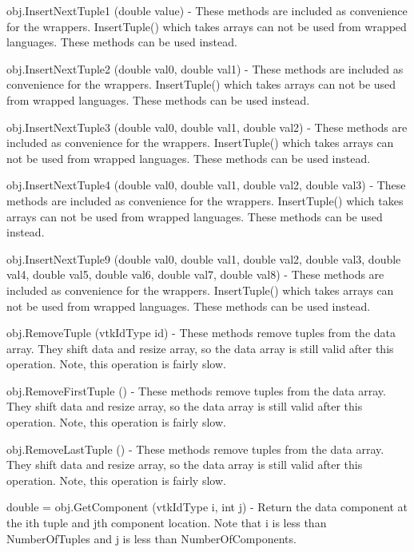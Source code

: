 \begin{DoxyItemize}
\item {\ttfamily obj.\-Insert\-Next\-Tuple1 (double value)} -\/ These methods are included as convenience for the wrappers. Insert\-Tuple() which takes arrays can not be used from wrapped languages. These methods can be used instead.  
\item {\ttfamily obj.\-Insert\-Next\-Tuple2 (double val0, double val1)} -\/ These methods are included as convenience for the wrappers. Insert\-Tuple() which takes arrays can not be used from wrapped languages. These methods can be used instead.  
\item {\ttfamily obj.\-Insert\-Next\-Tuple3 (double val0, double val1, double val2)} -\/ These methods are included as convenience for the wrappers. Insert\-Tuple() which takes arrays can not be used from wrapped languages. These methods can be used instead.  
\item {\ttfamily obj.\-Insert\-Next\-Tuple4 (double val0, double val1, double val2, double val3)} -\/ These methods are included as convenience for the wrappers. Insert\-Tuple() which takes arrays can not be used from wrapped languages. These methods can be used instead.  
\item {\ttfamily obj.\-Insert\-Next\-Tuple9 (double val0, double val1, double val2, double val3, double val4, double val5, double val6, double val7, double val8)} -\/ These methods are included as convenience for the wrappers. Insert\-Tuple() which takes arrays can not be used from wrapped languages. These methods can be used instead.  
\item {\ttfamily obj.\-Remove\-Tuple (vtk\-Id\-Type id)} -\/ These methods remove tuples from the data array. They shift data and resize array, so the data array is still valid after this operation. Note, this operation is fairly slow.  
\item {\ttfamily obj.\-Remove\-First\-Tuple ()} -\/ These methods remove tuples from the data array. They shift data and resize array, so the data array is still valid after this operation. Note, this operation is fairly slow.  
\item {\ttfamily obj.\-Remove\-Last\-Tuple ()} -\/ These methods remove tuples from the data array. They shift data and resize array, so the data array is still valid after this operation. Note, this operation is fairly slow.  
\item {\ttfamily double = obj.\-Get\-Component (vtk\-Id\-Type i, int j)} -\/ Return the data component at the ith tuple and jth component location. Note that i is less than Number\-Of\-Tuples and j is less than Number\-Of\-Components.  

\end{DoxyItemize}
